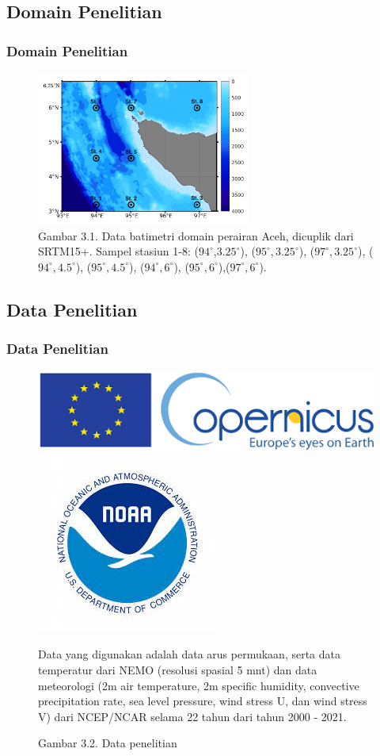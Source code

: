 \documentclass{beamer}
\begin{document}
\subsection{Domain Penelitian}
\begin{frame}
	\frametitle{Domain Penelitian}
	\begin{figure}[H]
		\centering
		\includegraphics[width=7cm]{bathymetri}
		\captionsetup{labelformat=empty}
		\caption{Gambar 3.1. Data batimetri domain perairan Aceh, dicuplik dari SRTM15+. Sampel stasiun 1-8: ($94^\circ$,$3.25^\circ$), ($95^\circ,3.25^\circ$), ($97^\circ,3.25^\circ$),	($94^\circ,4.5^\circ$), ($95^\circ,4.5^\circ$),	($94^\circ,6^\circ$), ($95^\circ,6^\circ$),($97^\circ,6^\circ$).}
		\label{fig:domain}
		
	\end{figure}
\end{frame}

\subsection{Data Penelitian}
\begin{frame}
	\frametitle{Data Penelitian}
	\begin{figure}[H]
		\centering
		\includegraphics[width=.5\textwidth]{logo_cmmes.png}
		\\[\smallskipamount]
		\includegraphics[width=.24\textwidth]{logo_ncep.jpeg}
		\captionsetup{labelformat=empty}
		\caption{Gambar 3.2. Data penelitian}
		\label{fig:data}
		\tiny
		Data yang digunakan adalah data arus permukaan, serta data temperatur dari NEMO (resolusi spasial 5 mnt) dan data meteorologi (2m air temperature, 2m specific
		humidity, convective precipitation rate, sea level pressure, wind stress U, dan wind
		stress V) dari NCEP/NCAR selama 22 tahun dari tahun 2000 - 2021. 
	\end{figure}
\end{frame}
\end{document}
